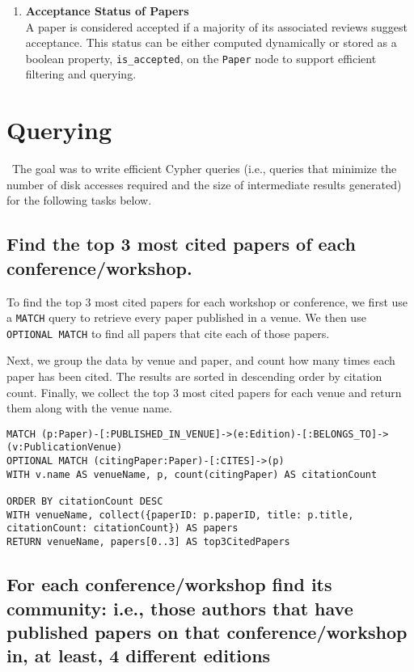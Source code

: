 \documentclass{article}
\begin{document}
\begin{enumerate}
    \item \textbf{Acceptance Status of Papers} \\
    A paper is considered accepted if a majority of its associated reviews suggest acceptance. This status can be either computed dynamically or stored as a boolean property, \texttt{is\_accepted}, on the \texttt{Paper} node to support efficient filtering and querying.
\end{enumerate}

\section{Querying} \
The goal was to write efficient Cypher queries (i.e., queries that minimize the number of disk accesses required and the size of intermediate results generated) for the following tasks below.

\subsection{Find the top 3 most cited papers of each conference/workshop.}\label{sec_top3}
To find the top 3 most cited papers for each workshop or conference, we first use a \texttt{MATCH} query to retrieve every paper published in a venue. We then use \texttt{OPTIONAL MATCH} to find all papers that cite each of those papers.

Next, we group the data by venue and paper, and count how many times each paper has been cited. The results are sorted in descending order by citation count. Finally, we collect the top 3 most cited papers for each venue and return them along with the venue name.

\begin{verbatim}
MATCH (p:Paper)-[:PUBLISHED_IN_VENUE]->(e:Edition)-[:BELONGS_TO]->(v:PublicationVenue)
OPTIONAL MATCH (citingPaper:Paper)-[:CITES]->(p)
WITH v.name AS venueName, p, count(citingPaper) AS citationCount
                 
ORDER BY citationCount DESC
WITH venueName, collect({paperID: p.paperID, title: p.title, citationCount: citationCount}) AS papers
RETURN venueName, papers[0..3] AS top3CitedPapers
\end{verbatim}

\subsection{For each conference/workshop find its community: i.e., those authors that have
published papers on that conference/workshop in, at least, 4 different editions}
\end{document}
